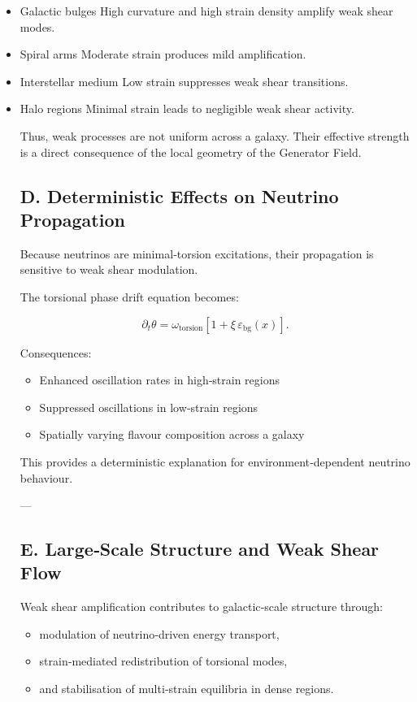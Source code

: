 \documentclass[reprint,amsmath,amssymb,aps,prl,floatfix]{revtex4-2}
\begin{document}
\begin{itemize}
\item Galactic bulges  
   High curvature and high strain density amplify weak shear modes.

\item Spiral arms  
   Moderate strain produces mild amplification.

\item Interstellar medium  
   Low strain suppresses weak shear transitions.

\item Halo regions  
   Minimal strain leads to negligible weak shear activity.

Thus, weak processes are not uniform across a galaxy.  
Their effective strength is a direct consequence of the local geometry of the Generator Field.

\subsection{D. Deterministic Effects on Neutrino Propagation}

Because neutrinos are minimal‑torsion excitations, their propagation is sensitive to weak shear modulation.

The torsional phase drift equation becomes:

\[
\partial_t \theta
=
\omega_{\mathrm{torsion}}
\left[
1 + \xi\,\varepsilon_{\mathrm{bg}}(x)
\right].
\]

Consequences:
\begin{itemize}
\item Enhanced oscillation rates in high‑strain regions  
\item Suppressed oscillations in low‑strain regions  
\item Spatially varying flavour composition across a galaxy
\end{itemize}

This provides a deterministic explanation for environment‑dependent neutrino behaviour.

---

\subsection{E. Large‑Scale Structure and Weak Shear Flow}

Weak shear amplification contributes to galactic‑scale structure through:

\begin{itemize}
\item modulation of neutrino‑driven energy transport,  
\item strain‑mediated redistribution of torsional modes,  
\item and stabilisation of multi‑strain equilibria in dense regions.
\end{itemize}


\end{itemize}
\end{document}
